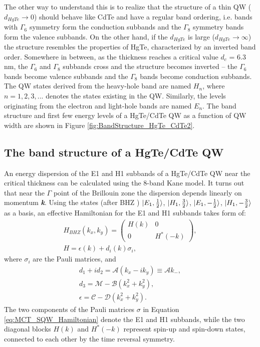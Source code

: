 \documentclass[titlepage,a4paper]{book}
\newcommand{\wciecie}{\quad\phantom{v}}
\begin{document}
The other way to understand this is to realize that the structure of a thin QW ($d_{HgTe} \rightarrow 0$) should behave like CdTe and have a regular band ordering, i.e. bands with $\Gamma_6$ symmetry form the conduction subbands and the $\Gamma_8$ symmetry bands form the valence subbands. On the other hand, if the $d_{HgTe}$ is large ($d_{HgTe} \rightarrow \infty$) the structure resembles the properties of HgTe, characterized by an inverted band order. Somewhere in between, as the thickness reaches a critical value $d_c$ = 6.3 nm, the $\Gamma_6$ and $\Gamma_8$ subbands cross and the structure becomes inverted -- the $\Gamma_6$ bands become valence subbands and the $\Gamma_8$ bands become conduction subbands. The QW states derived from the heavy-hole band are named $H_n$, where $n = 1, 2, 3, ...$ denotes the states existing in the QW. Similarly, the levels originating from the electron and light-hole bands are named $E_n$. The band structure and first few energy levels of a HgTe/CdTe QW as a function of QW width are shown in Figure \ref{fig:BandStructure_HgTe_CdTe2}.  

\subsection{The band structure of a HgTe/CdTe QW}
\wciecie
An energy dispersion of the E1 and H1 subbands of a HgTe/CdTe QW near the critical thickness can be calculated using the 8-band Kane model. It turns out that near the $\Gamma$ point of the Brillouin zone the dispersion depends linearly on momentum \textbf{\textit{k}}. Using the states (after BHZ \cite{Bernevig_Topology2}) $\ket{E_1,\frac{1}{2}}$, $\ket{H_1,\frac{3}{2}}$, $\ket{E_1,-\frac{1}{2}}$, $\ket{H_1,-\frac{3}{2}}$ as a basis, an effective Hamiltonian for the E1 and H1 subbands takes form of:
\begin{equation}
\label{eq:MCT_SQW_Hamiltonian}
\begin{aligned}
H_{BHZ}(k_x, k_y) =  \left( \begin{array}{cc}
H(k) & 0 \\
0 & H^*(-k) \end{array} \right), \\
H = \epsilon (k) + d_i (k) \sigma_i,
\end{aligned}
\end{equation}
where $\sigma_i$ are the Pauli matrices, and
\begin{equation}
\label{eq:MCT_SQW_Hamiltonian2}
\begin{aligned}
d_1 + id_2 = \mathcal{A}(k_x - ik_y) \equiv \mathcal{A}k_-, \\
d_3 = \mathcal{M} - \mathcal{B}(k_x^2 + k_y^2), \\
\epsilon = \mathcal{C} - \mathcal{D}(k_x^2 + k_y^2).
\end{aligned}
\end{equation}
The two components of the Pauli matrices $\sigma$ in Equation \ref{eq:MCT_SQW_Hamiltonian} denote the E1 and H1 subbands, while the two diagonal blocks $H(k)$ and $H^*(-k)$ represent spin-up and spin-down states, connected to each other by the time reversal symmetry. 
\end{document}
